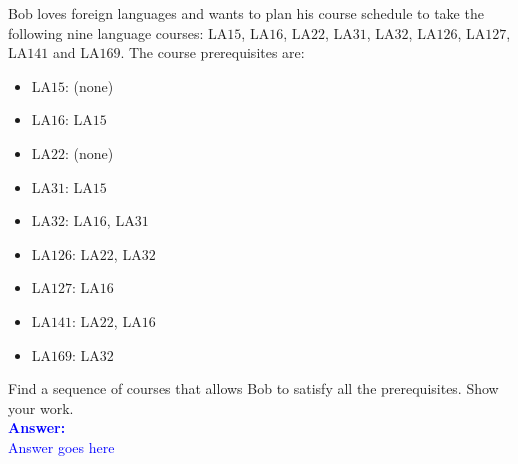 \item{}
Bob loves foreign languages and wants to plan his course schedule to take the
following nine language courses: LA$15$, LA$16$, LA$22$, LA$31$, LA$32$,
LA$126$, LA$127$, LA$141$ and LA$169$. The course prerequisites are:
\begin{itemize}
    \item LA$15$: (none)
    \item LA$16$: LA$15$
    \item LA$22$: (none)
    \item LA$31$: LA$15$
    \item LA$32$: LA$16$, LA$31$
    \item LA$126$: LA$22$, LA$32$
    \item LA$127$: LA$16$
    \item LA$141$: LA$22$, LA$16$
    \item LA$169$: LA$32$
\end{itemize}
Find a sequence of courses that allows Bob to satisfy all the prerequisites.
Show your work.\\[12pt]
\ifanswers
\textcolor{blue}{
\textbf{Answer:}\\[6pt]
Answer goes here
}
\newpage
\fi
